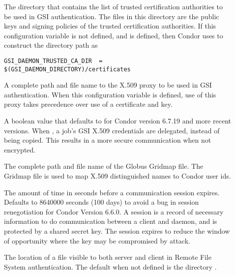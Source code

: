 \begin{description}
\item[]
\label{param:GSIDaemonTrustedCADir} The directory that contains the
list of trusted certification authorities to be used in GSI authentication.
The files in this directory are the public keys and signing policies
of the trusted certification authorities.
If this configuration variable is not defined, and
 is defined, then Condor uses
 to construct the directory path as
\begin{verbatim}
GSI_DAEMON_TRUSTED_CA_DIR  = $(GSI_DAEMON_DIRECTORY)/certificates
\end{verbatim}

\item[]
\label{param:GSIDaemonProxy} A complete path and file name to the
X.509 proxy to be used in GSI authentication.
When this configuration variable is defined, use of this proxy
takes precedence over use of a certificate and key.

\item[]
\label{param:DelegateJobGSICredentials} 
A boolean value that defaults to  for Condor version 6.7.19
and more recent versions.
When , a job's GSI X.509 credentials are delegated,
instead of being copied.
This results in a more secure communication when not encrypted.

\item[]
\label{param:GridMap}
The complete path and file name of the Globus Gridmap file.
The Gridmap file is used to map
X.509 distinguished names to Condor user ids.

\item[]
\label{param:SessionDuration} The amount of time in seconds before
a communication session expires.
Defaults to 8640000 seconds (100 days) to avoid a bug in session
renegotiation for Condor Version 6.6.0.
A session is a record of necessary information to do communication
between a client and daemon, and is protected by a shared secret key.
The session expires to reduce the window of opportunity where
the key may be compromised by attack.

\item[]
\label{param:FSRemoteDir}
The location of a file visible to both server and client in
Remote File System authentication.
The default when not defined is the directory 
.


\end{description}
